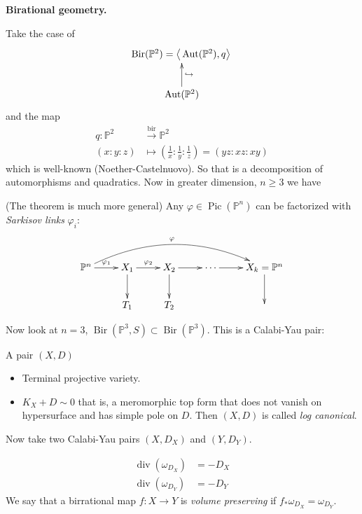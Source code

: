 \medskip\noindent
\textbf{Birational geometry.}

Take the case of
$$
\xymatrix{
\operatorname{Bir}(\mathbb{P}^2)=
\left\langle{}\operatorname{Aut}(\mathbb{P}^2),
q\right\rangle{}\\
\operatorname{Aut}(\mathbb{P}^2)
\ar[u]_{\hookrightarrow}
}
$$
and the map
$$
\begin{aligned}
	q: \mathbb{P}^2
	&\overset{\operatorname{bir}}
	{\longrightarrow}
	\mathbb{P}^2
	\\
	(x:y:z) &\longmapsto
	\left(\frac{1}{x}:\frac{1}{y}:
	\frac{1}{z}\right)=(yz:xz:xy)
\end{aligned}
$$
which is well-known (Noether-Castelnuovo). So
that is a decomposition of automorphisms and
quadratics. Now in greater dimension, $n\geq
3$ we have

\begin{theorem}\leavevmode
	(The theorem is much more general) Any
	$\varphi
	\in\operatorname{Pic}(\mathbb{P}^n)$ can be
	factorized with  {\it Sarkisov
	links}  $\varphi_i$:
	$$\xymatrix{
		\mathbb{P}^n
		\ar[r]^-{\varphi_1}
		\ar@/^2pc/[rrrr]^-{\varphi}
		&
		X_1\ar[r]^-{\varphi_2}\ar[d]
		&
		X_2\ar[r]\ar[d]
		&
		\cdots
		\ar[r]
		&
		X_k=\mathbb{P}^n\ar[d]
		\\
		&T_1&T_2&&
	}$$
\end{theorem}

Now look at $n=3$,
$\operatorname{Bir}(\mathbb{P}^3,S)\subset
\operatorname{Bir}(\mathbb{P}^3)$. This is a
Calabi-Yau pair:

\begin{definition}%
[Calabi-Yau pair]\leavevmode 
	A pair $(X,D)$
	\begin{itemize}
	\item Terminal projective variety.
	\item $K_X+D\sim0$ that is, a meromorphic
	top form that does not vanish on
	hypersurface and has simple pole on $D$.
	Then $(X,D)$ is called {\it log
	canonical}.
	\end{itemize}

Now take two Calabi-Yau pairs $(X,D_X)$ and
$(Y,D_Y)$.

 $$
\begin{aligned}
	\operatorname{div}(\omega_{D_X})&=-D_X\\
	\operatorname{div}(\omega_{D_Y})&=-D_Y
\end{aligned}
$$
We say that a birrational map $f:X\to Y$ is
{\it volume preserving} if
$f_*\omega_{D_X}=\omega_{D_Y}$.

\end{definition}


